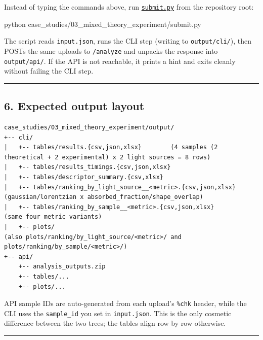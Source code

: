 \documentclass[
  11pt,
]{article}
\newenvironment{Shaded}{}{}
\newcommand{\ExtensionTok}[1]{#1}
\newcommand{\NormalTok}[1]{#1}
\begin{document}
Instead of typing the commands above, run
\href{https://github.com/pinarsyt/overlap-calculator/blob/main/case_studies/03_mixed_theory_experiment/submit.py}{\texttt{submit.py}}
from the repository root:

\begin{Shaded}
\begin{Highlighting}[]
\ExtensionTok{python}\NormalTok{ case\_studies/03\_mixed\_theory\_experiment/submit.py}
\end{Highlighting}
\end{Shaded}

The script reads \texttt{input.json}, runs the CLI step (writing to
\texttt{output/cli/}), then POSTs the same uploads to \texttt{/analyze}
and unpacks the response into \texttt{output/api/}. If the API is not
reachable, it prints a hint and exits cleanly without failing the CLI
step.

\begin{center}\rule{0.5\linewidth}{0.5pt}\end{center}

\hypertarget{6-expected-output-layout}{
\subsection{6. Expected output layout}\label{6-expected-output-layout}}

\begin{verbatim}
case_studies/03_mixed_theory_experiment/output/
+-- cli/
|   +-- tables/results.{csv,json,xlsx}        (4 samples (2 theoretical + 2 experimental) x 2 light sources = 8 rows)
|   +-- tables/results_timings.{csv,json,xlsx}
|   +-- tables/descriptor_summary.{csv,xlsx}
|   +-- tables/ranking_by_light_source__<metric>.{csv,json,xlsx}   (gaussian/lorentzian x absorbed_fraction/shape_overlap)
|   +-- tables/ranking_by_sample__<metric>.{csv,json,xlsx}          (same four metric variants)
|   +-- plots/                                                      (also plots/ranking/by_light_source/<metric>/ and plots/ranking/by_sample/<metric>/)
+-- api/
    +-- analysis_outputs.zip
    +-- tables/...
    +-- plots/...
\end{verbatim}

API sample IDs are auto-generated from each upload's \texttt{\%chk}
header, while the CLI uses the \texttt{sample\_id} you set in
\texttt{input.json}. This is the only cosmetic difference between the
two trees; the tables align row by row otherwise.

\begin{center}\rule{0.5\linewidth}{0.5pt}\end{center}
\end{document}
